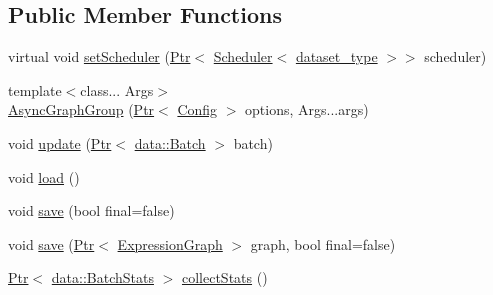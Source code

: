 \subsection*{Public Member Functions}
\begin{DoxyCompactItemize}
\item 
virtual void \hyperlink{classmarian_1_1AsyncGraphGroup_a484f82af7b76c33d6b48b5b9f168979f}{set\+Scheduler} (\hyperlink{namespacemarian_ad1a373be43a00ef9ce35666145137b08}{Ptr}$<$ \hyperlink{classmarian_1_1Scheduler}{Scheduler}$<$ \hyperlink{classmarian_1_1AsyncGraphGroup_a94dd3794d340f8912f60a2c921a0dbf7}{dataset\+\_\+type} $>$$>$ scheduler)
\item 
{\footnotesize template$<$class... Args$>$ }\\\hyperlink{classmarian_1_1AsyncGraphGroup_a722544018387106b41110a8a66f76053}{Async\+Graph\+Group} (\hyperlink{namespacemarian_ad1a373be43a00ef9ce35666145137b08}{Ptr}$<$ \hyperlink{classmarian_1_1Config}{Config} $>$ options, Args...\+args)
\item 
void \hyperlink{classmarian_1_1AsyncGraphGroup_a0a5075263b8f643c4c87401cd3baf893}{update} (\hyperlink{namespacemarian_ad1a373be43a00ef9ce35666145137b08}{Ptr}$<$ \hyperlink{classmarian_1_1data_1_1Batch}{data\+::\+Batch} $>$ batch)
\item 
void \hyperlink{classmarian_1_1AsyncGraphGroup_aa67a42e3de3f05cacc19971605cb95ba}{load} ()
\item 
void \hyperlink{classmarian_1_1AsyncGraphGroup_ac4f28a3b7e1f131ecb0975c3633833a9}{save} (bool final=false)
\item 
void \hyperlink{classmarian_1_1AsyncGraphGroup_a3793b99886964cbd1c8adae3c6067092}{save} (\hyperlink{namespacemarian_ad1a373be43a00ef9ce35666145137b08}{Ptr}$<$ \hyperlink{classmarian_1_1ExpressionGraph}{Expression\+Graph} $>$ graph, bool final=false)
\item 
\hyperlink{namespacemarian_ad1a373be43a00ef9ce35666145137b08}{Ptr}$<$ \hyperlink{classmarian_1_1data_1_1BatchStats}{data\+::\+Batch\+Stats} $>$ \hyperlink{classmarian_1_1AsyncGraphGroup_af06826971306ef236a0e4ff13e7b2e74}{collect\+Stats} ()
\end{DoxyCompactItemize}
